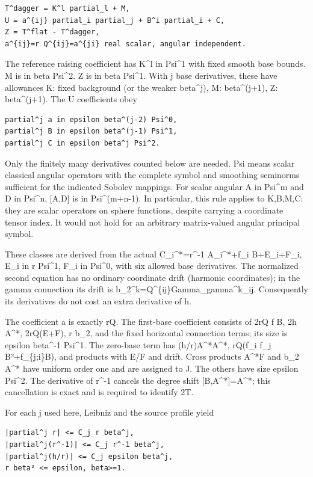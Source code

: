 \documentclass[11pt]{article}
\theoremstyle{definition}
\theoremstyle{remark}
\numberwithin{equation}{section}
\begin{document}
\begin{verbatim}
T^dagger = K^l partial_l + M,
U = a^{ij} partial_i partial_j + B^i partial_i + C,
Z = T^flat - T^dagger,
a^{ij}=r Q^{ij}=a^{ji} real scalar, angular independent.
\end{verbatim}

The reference raising coefficient has K\^{}l in Psi\^{}1 with fixed
smooth base bounds. M is in beta Psi\^{}2. Z is in beta Psi\^{}1. With j
base derivatives, these have allowances K: fixed background (or the
weaker beta\^{}j), M: beta\^{}(j+1), Z: beta\^{}(j+1). The U
coefficients obey

\begin{verbatim}
partial^j a in epsilon beta^(j-2) Psi^0,
partial^j B in epsilon beta^(j-1) Psi^1,
partial^j C in epsilon beta^j Psi^2.
\end{verbatim}

Only the finitely many derivatives counted below are needed. Psi means
scalar classical angular operators with the complete symbol and
smoothing seminorms sufficient for the indicated Sobolev mappings. For
scalar angular A in Psi\^{}m and D in Psi\^{}n, {[}A,D{]} is in
Psi\^{}(m+n-1). In particular, this rule applies to K,B,M,C: they are
scalar operators on sphere functions, despite carrying a coordinate
tensor index. It would not hold for an arbitrary matrix-valued angular
principal symbol.

These classes are derived from the actual C\_i\^{}*=r\^{}-1
A\_i\^{}*+f\_i B+E\_i+F\_i, E\_i in r Psi\^{}1, F\_i in Psi\^{}0, with
six allowed base derivatives. The normalized second equation has no
ordinary coordinate drift (harmonic coordinates); in the gamma
connection its drift is b\_2\^{}k=Q\^{}\{ij\}Gamma\_gamma\^{}k\_ij.
Consequently its derivatives do not cost an extra derivative of h.

The coefficient a is exactly rQ. The first-base coefficient consists of
2rQ f B, 2h A\^{}*, 2rQ(E+F), r b\_2, and the fixed horizontal
connection terms; its size is epsilon beta\^{}-1 Psi\^{}1. The zero-base
term has (h/r)A\^{}*A\^{}*, rQ(f\_i f\_j B²+f\_\{j;i\}B), and products
with E/F and drift. Cross products A\^{}*F and b\_2 A\^{}* have uniform
order one and are assigned to J. The others have size epsilon Psi\^{}2.
The derivative of r\^{}-1 cancels the degree shift
{[}B,A\^{}*{]}=A\^{}*; this cancellation is exact and is required to
identify 2T.

For each j used here, Leibniz and the source profile yield

\begin{verbatim}
|partial^j r| <= C_j r beta^j,
|partial^j(r^-1)| <= C_j r^-1 beta^j,
|partial^j(h/r)| <= C_j epsilon beta^j,
r beta² <= epsilon, beta>=1.
\end{verbatim}
\end{document}
